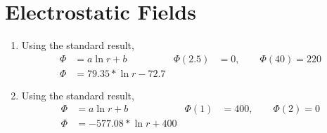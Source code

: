 \section{Electrostatic Fields}

\begin{enumerate}
    \item Using the standard result,
          \begin{align}
              \Phi      & = a \ln r + b              &
              \Phi(2.5) & = 0, \qquad \Phi(40) = 220   \\
              \Phi      & = 79.35*\ln r - 72.7
          \end{align}

    \item Using the standard result,
          \begin{align}
              \Phi    & = a \ln r + b             &
              \Phi(1) & = 400, \qquad \Phi(2) = 0   \\
              \Phi    & = -577.08*\ln r + 400
          \end{align}


\end{enumerate}
